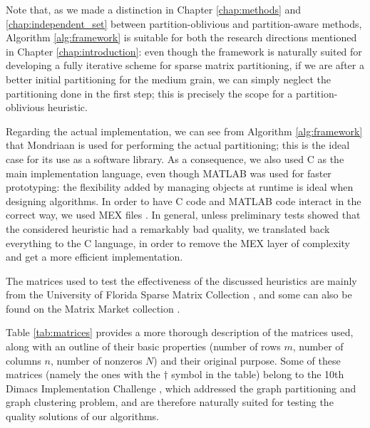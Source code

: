 Note that, as we made a distinction in Chapter \ref{chap:methods} and \ref{chap:independent_set} between partition-oblivious and partition-aware methods, Algorithm \ref{alg:framework} is suitable for both the research directions mentioned in Chapter \ref{chap:introduction}: even though the framework is naturally suited for developing a fully iterative scheme for sparse matrix partitioning, if we are after a better initial partitioning for the medium grain, we can simply neglect the partitioning done in the first step; this is precisely the scope for a partition-oblivious heuristic.

Regarding the actual implementation, we can see from Algorithm \ref{alg:framework} that Mondriaan is used for performing the actual partitioning; this is the ideal case for its use as a software library. As a consequence, we also used C as the main implementation language, even though MATLAB was used for faster prototyping: the flexibility added by managing objects at runtime  is ideal when designing algorithms. In order to have C code and MATLAB code interact in the correct way, we used MEX files \cite{mex}. In general, unless preliminary tests showed that the considered heuristic had a remarkably bad quality, we translated back everything to the C language, in order to remove the MEX layer of complexity and get a more efficient implementation.

The matrices used to test the effectiveness of the discussed heuristics are mainly from the University of Florida Sparse Matrix Collection \cite{ufl}, and some can also be found on the Matrix Market collection \cite{matrixmarket}. 

Table \ref{tab:matrices} provides a more thorough description of the matrices used, along with an outline of their basic properties (number of rows $m$, number of columns $n$, number of nonzeros $N$) and their original purpose. Some of these matrices (namely the ones with the $\dagger$ symbol in the table) belong to the 10th Dimacs Implementation Challenge \cite{dimacs}, which addressed the graph partitioning and graph clustering problem, and are therefore naturally suited for testing the quality solutions of our algorithms.

